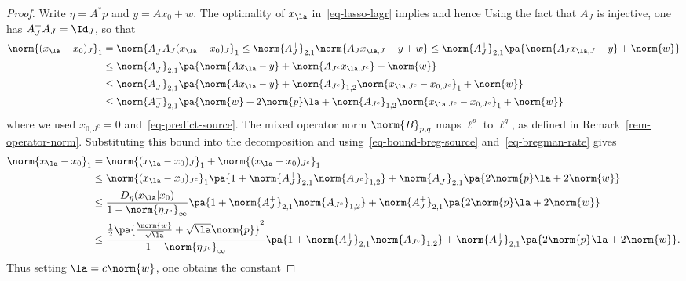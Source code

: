\begin{proof}
	Write $\eta=A^*p$ and $y=Ax_0+w$.
	The optimality of $x_\la$ in~\eqref{eq-lasso-lagr} implies
	and hence
	Using the fact that $A_J$ is injective, one has $A_J^+A_J=\Id_{J}$, so that
	\begin{align*}
		\norm{(x_\la-x_0)_J}_1 &= \norm{A_J^+ A_J(x_\la-x_0)_J}_1
			\leq \norm{A_J^+}_{2,1} \norm{ A_J x_{\la,J} - y + w }
			\leq \norm{A_J^+}_{2,1} \pa{ \norm{ A_J x_{\la,J} - y } + \norm{w} }  \\
			& \leq 
			\norm{A_J^+}_{2,1} \pa{ \norm{ A x_{\la} - y } + \norm{A_{J^c} x_{\la,J^c}} + \norm{w} }\\
			&\leq 
			\norm{A_J^+}_{2,1} \pa{ \norm{ A x_{\la} - y } + \norm{A_{J^c}}_{1,2} \norm{ x_{\la,J^c} - x_{0,J^c} }_1 + \norm{w} } \\
			&\leq 
			\norm{A_J^+}_{2,1} \pa{ \norm{w} + 2\norm{p}\la + \norm{A_{J^c}}_{1,2} \norm{ x_{\la,J^c} - x_{0,J^c} }_1 + \norm{w} }
	\end{align*}
	where we used $x_{0,J^c}=0$ and~\eqref{eq-predict-source}. The mixed operator norm $\norm{B}_{p,q}$ maps $\ell^p$ to $\ell^q$, as defined in Remark~\ref{rem-operator-norm}.
	Substituting this bound into the decomposition and using~\eqref{eq-bound-breg-source} and~\eqref{eq-bregman-rate} gives
	\begin{align*}
		\norm{x_\la-x_0}_1 &= \norm{(x_\la-x_0)_J}_1 + \norm{(x_\la-x_0)_{J^c}}_1 \\
		& \leq \norm{(x_\la-x_0)_{J^c}}_1 \pa{ 1 + \norm{A_J^+}_{2,1} \norm{A_{J^c}}_{1,2} }
		+ \norm{A_J^+}_{2,1} \pa{   2\norm{p} \la + 2 \norm{w} }		\\
		& \leq \frac{D_\eta(x_\la|x_0)}{1-\norm{\eta_{J^c}}_\infty} \pa{ 1 + \norm{A_J^+}_{2,1} \norm{A_{J^c}}_{1,2} }
		+ \norm{A_J^+}_{2,1} \pa{   2\norm{p} \la + 2 \norm{w} } \\
		& \leq \frac{ 
				\frac{1}{2}\pa{ \frac{\norm{w}}{\sqrt{\la}} + \sqrt{\la}\norm{p} }^2
			}{1-\norm{\eta_{J^c}}_\infty} \pa{ 1 + \norm{A_J^+}_{2,1} \norm{A_{J^c}}_{1,2} }
		+ \norm{A_J^+}_{2,1} \pa{   2\norm{p} \la + 2 \norm{w} }.
	\end{align*}	
	Thus setting $\la=c\norm{w}$, one obtains the constant
\end{proof}


